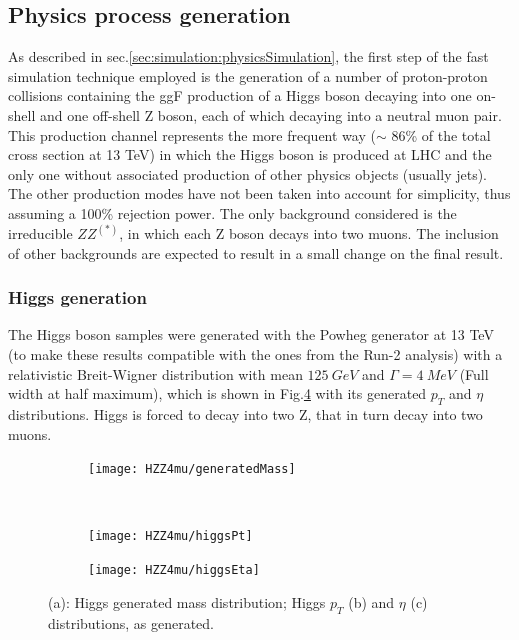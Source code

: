 \documentclass[a4paper,twoside,12pt]{article}
\begin{document}
\subsection{Physics process generation}
As described in sec.\ref{sec:simulation:physicsSimulation}, the first step of the fast simulation 
technique employed is the generation of a number of proton-proton collisions containing the
ggF production of a Higgs boson decaying into one on-shell and one off-shell Z boson, 
each of which decaying into a neutral muon pair. This production channel represents the more
frequent way ($\sim$ 86\% of the total cross section at 13 TeV) in which the Higgs boson is produced at LHC and the only one without 
associated production of other physics objects (usually jets). The other production modes have not been taken
into account for simplicity, thus assuming a 100\% rejection power. The only background considered is the irreducible $ZZ^{(*)}$, 
in which each Z boson decays into two muons. The inclusion of other backgrounds are expected to 
result in a small change on the final result\cite{scoping}.

\subsubsection{Higgs generation}

The Higgs boson samples were generated with the Powheg generator at 13 TeV (to make these results compatible with the ones from the
Run-2 analysis) with a 
relativistic Breit-Wigner distribution with mean $125\ GeV$ and $\Gamma = 4\ MeV$ (Full
width at half maximum), which 
is shown in Fig.\ref{fig:HZZ4mu:generatedHiggs} with its generated $p_T$ and $\eta$ distributions. Higgs
is forced to decay into two Z, that in turn decay into two muons.\\

\begin{figure}
\begin{subfigure}{.5\linewidth}
\texttt{[image: HZZ4mu/generatedMass]}
\caption{}
\label{fig:HZZ4mu:generatedHiggs}
\end{subfigure}\\[1ex]
\begin{subfigure}{.5\linewidth}
\centering
\texttt{[image: HZZ4mu/higgsPt]}
\caption{}
\label{fig:HZZ4mu:higgsPt}
\end{subfigure}
\begin{subfigure}{.5\linewidth}
\centering
\texttt{[image: HZZ4mu/higgsEta]}
\caption{}
\label{fig:HZZ4mu:higgsEta}
\end{subfigure}
\caption{(a): Higgs generated mass distribution;	Higgs $p_{T}$ (b) and $\eta$ (c) distributions, as generated.}
\label{fig:HZZ4mu:generatedHiggs}
\end{figure}
\end{document}
